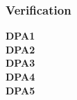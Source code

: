 \documentclass{article}
\begin{document}
\subsubsection{Verification}
\textbf{DPA1} \mbox{} \\
\textbf{DPA2} \mbox{} \\
\textbf{DPA3} \mbox{} \\
\textbf{DPA4} \mbox{} \\
\textbf{DPA5} \mbox{} \\

\end{document}
